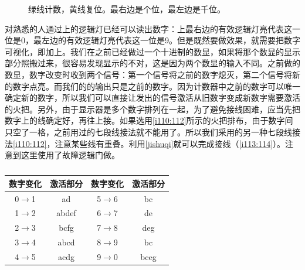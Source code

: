 \begin{figure}[!ht]
  \centering

  \caption{绿线计数，黄线复位。最右边是个位，最左边是千位。}
  \label{i108:109}
\end{figure}

对\ShiftRegister 熟悉的人通过\ShiftRegister 上的逻辑灯已经可以读出数字：\ShiftRegister 上最右边的有效逻辑灯亮代表这一位是0，最左边的有效逻辑灯亮代表这一位是9。但是既然要做效果，就需要把数字可视化，即加上。我们在之前已经做过一个十进制的数显，如果将那个数显的显示部分照搬过来，很容易发现显示的不对，这是因为两个数显的输入不同。之前做的数显，数字改变时收到两个信号：第一个信号将之前的数字熄灭，第二个信号将新的数字点亮。而我们的\ShiftRegister 的输出只是之前的数字。因为计数器中之前的数字可以唯一确定新的数字，所以我们可以直接让\ShiftRegister 发出的信号激活从旧数字变成新数字需要激活的火把。另外，由于显示器是多个数字排列在一起，为了避免接线困难，应当先把数字上的线确定好，再往\ShiftRegister 上接。如果选用\autoref{i110:112}所示的火把排布，由于数字间只空了一格，之前用过的七段线接法就不能用了。所以我们采用的另一种七段线接法\autoref{i110:112}，注意某些线有重叠。利用\autoref{jishuqi}就可以完成接线（\autoref{i113:114}）。注意到这里使用了故障逻辑门做。

\begin{figure}[!ht]
  \centering
  \caption{}
  \label{i110:112}
\end{figure}

\begin{table}[!ht]
  \centering
  \begin{tabular}{|cc||cc|}
    \hline
    数字变化 & 激活部分 & 数字变化 & 激活部分 \\\hline
    0$\to$1  & ad       & 5$\to$6  & bc \\
    1$\to$2  & abdef    & 6$\to$7  & de \\
    2$\to$3  & bcfg     & 7$\to$8  & deg \\
    3$\to$4  & abcd     & 8$\to$9  & bc \\
    4$\to$5  & acdg     & 9$\to$0  & bceg \\\hline
  \end{tabular}
  \caption{}
  \label{jishuqi}
\end{table}

